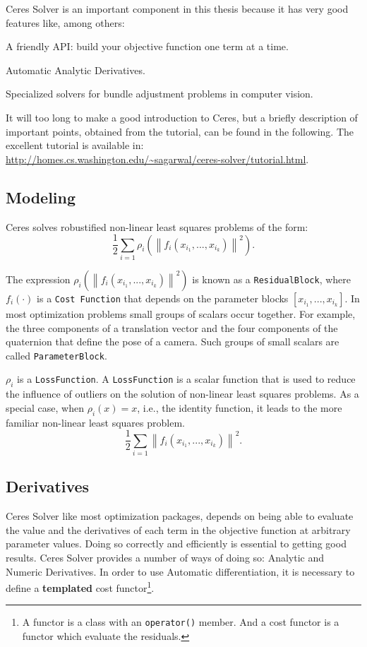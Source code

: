 Ceres Solver is an important component in this thesis because it has very good features like, among others:
\begin{itemize*}
\item A friendly API: build your objective function one term at a time.
\item Automatic Analytic Derivatives.
\item Specialized solvers for bundle adjustment problems in computer vision.
\end{itemize*}

It will too long to make a good introduction to Ceres, but a briefly description of important points, obtained from the tutorial, can be found in the following. The excellent tutorial is available in: \url{http://homes.cs.washington.edu/~sagarwal/ceres-solver/tutorial.html}.

\subsection*{Modeling}
Ceres solves robustified non-linear least squares problems of the form:
\begin{equation}
\frac{1}{2}\sum_{i=1} \rho_i\left(\left\|f_i\left(x_{i_1}, ... ,x_{i_k}\right)\right\|^2\right).
\end{equation}

The expression $\rho_i\left(\left\|f_i\left(x_{i_1},...,x_{i_k}\right)\right\|^2\right)$ is known as a \texttt{ResidualBlock}, where $f_i(\cdot)$ is a \texttt{Cost Function} that depends on the parameter blocks $\left[x_{i_1},... , x_{i_k}\right]$. In most optimization problems small groups of scalars occur together. For example, the three components of a translation vector and the four components of the quaternion that define the pose of a camera. Such groups of small scalars are called \texttt{ParameterBlock}.

$\rho_i$ is a \texttt{LossFunction}. A \texttt{LossFunction} is a scalar function that is used to reduce the influence of outliers on the solution of non-linear least squares problems. As a special case, when $\rho_i(x) = x$, i.e., the identity function, it leads to the more familiar non-linear least squares problem.
\[
 \frac{1}{2}\sum_{i=1} \left\|f_i\left(x_{i_1}, ... ,x_{i_k}\right)\right\|^2.
\]

\subsection*{Derivatives}
Ceres Solver like most optimization packages, depends on being able to evaluate the value and the derivatives of each term in the objective function at arbitrary parameter values. Doing so correctly and efficiently is essential to getting good results. Ceres Solver provides a number of ways of doing so: Analytic and Numeric Derivatives. In order to use Automatic differentiation, it is necessary to define a \textbf{templated} cost functor\footnote{A functor is a class with an \texttt{operator()} member. And a cost functor is a functor which evaluate the residuals.}.



